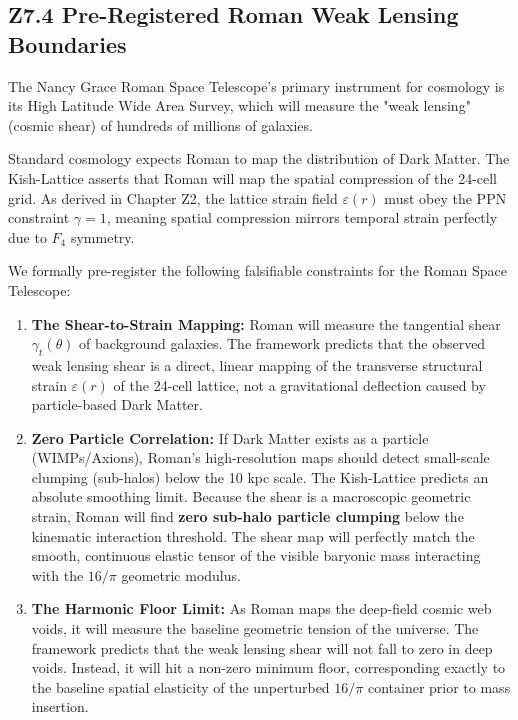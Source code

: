 \documentclass[11pt, letterpaper, openany]{book}
\begin{document}
\subsection*{Z7.4 Pre-Registered Roman Weak Lensing Boundaries}

The Nancy Grace Roman Space Telescope's primary instrument for cosmology is its High Latitude Wide Area Survey, which will measure the "weak lensing" (cosmic shear) of hundreds of millions of galaxies. 

Standard cosmology expects Roman to map the distribution of Dark Matter. The Kish-Lattice asserts that Roman will map the spatial compression of the 24-cell grid. As derived in Chapter Z2, the lattice strain field $\varepsilon(r)$ must obey the PPN constraint $\gamma = 1$, meaning spatial compression mirrors temporal strain perfectly due to $F_4$ symmetry. 

We formally pre-register the following falsifiable constraints for the Roman Space Telescope:

\begin{enumerate}
    \item \textbf{The Shear-to-Strain Mapping:} Roman will measure the tangential shear $\gamma_t(\theta)$ of background galaxies. The framework predicts that the observed weak lensing shear is a direct, linear mapping of the transverse structural strain $\varepsilon(r)$ of the 24-cell lattice, not a gravitational deflection caused by particle-based Dark Matter. 
    \item \textbf{Zero Particle Correlation:} If Dark Matter exists as a particle (WIMPs/Axions), Roman's high-resolution maps should detect small-scale clumping (sub-halos) below the 10 kpc scale. The Kish-Lattice predicts an absolute smoothing limit. Because the shear is a macroscopic geometric strain, Roman will find \textbf{zero sub-halo particle clumping} below the kinematic interaction threshold. The shear map will perfectly match the smooth, continuous elastic tensor of the visible baryonic mass interacting with the $16/\pi$ geometric modulus.
    \item \textbf{The Harmonic Floor Limit:} As Roman maps the deep-field cosmic web voids, it will measure the baseline geometric tension of the universe. The framework predicts that the weak lensing shear will not fall to zero in deep voids. Instead, it will hit a non-zero minimum floor, corresponding exactly to the baseline spatial elasticity of the unperturbed $16/\pi$ container prior to mass insertion.
\end{enumerate}
\end{document}
